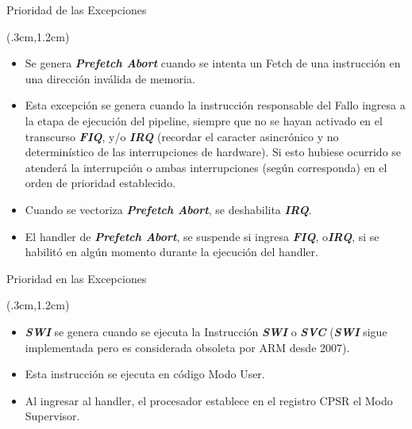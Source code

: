 \documentclass[table,x11names,aspectratio=169]{beamer}
\begin{document}
\begin{frame}{Prioridad de las Excepciones}
 \begin{textblock*}{\textwidth}(.3cm,1.2cm)
  \begin{itemize}[<+->] \justifying \parskip 0.3cm
   \item Se genera \textit{\textbf{Prefetch Abort}} cuando se intenta un Fetch de una instrucción en una dirección inválida de memoria.
   \item Esta excepción se genera cuando la instrucción responsable del Fallo ingresa a la etapa de ejecución del pipeline, siempre que no se hayan activado en el transcurso \textbf{\textit{FIQ}}, y/o \textit{\textbf{IRQ}} (recordar el caracter asincrónico y no determinístico de las interrupciones de hardware).
   Si esto hubiese ocurrido se atenderá la interrupción o ambas interrupciones (según corresponda) en el orden de prioridad establecido.
   \item Cuando se vectoriza \textbf{\textit{Prefetch Abort}}, se deshabilita \textbf{\textit{IRQ}}. 
   \item El handler de \textit{\textbf{Prefetch Abort}}, se suspende si ingresa \textbf{\textit{FIQ}}, o\textbf{\textit{IRQ}}, si se habilitó en algún momento durante la ejecución del handler. 
  \end{itemize}
 \end{textblock*}
\end{frame}

\begin{frame}{Prioridad en las Excepciones}
 \begin{textblock*}{\textwidth}(.3cm,1.2cm)
  \begin{itemize}[<+->] \justifying \parskip 0.3cm
   \item \textbf{\textit{SWI}} se genera cuando se ejecuta la Instrucción \textbf{\textit{SWI}} o \textbf{\textit{SVC}} (\textbf{\textit{SWI}} sigue implementada pero es considerada obsoleta por ARM desde 2007).
   \item Esta instrucción se ejecuta en código Modo User. 
   \item Al ingresar al handler, el procesador establece en el registro CPSR el Modo Supervisor.
  \end{itemize}
 \end{textblock*}
\end{frame}
\end{document}

